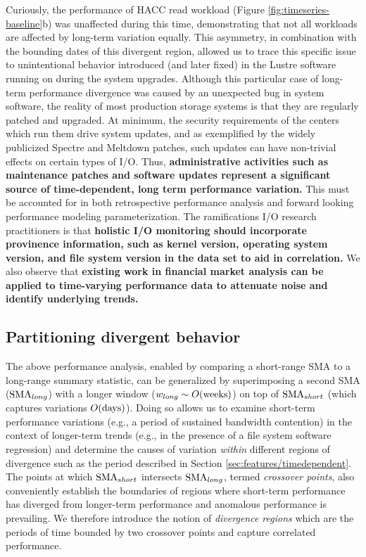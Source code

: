 Curiously, the performance of HACC read workload (Figure \ref{fig:timeseries-baseline}b) was unaffected during this time, demonstrating that not all workloads are affected by long-term variation equally.
This asymmetry, in combination with the bounding dates of this divergent region, allowed us to trace this specific issue to unintentional behavior introduced (and later fixed) in the Lustre software running on \cori during the system upgrades.
Although this particular case of long-term performance divergence was caused by an unexpected bug in system software, the reality of most production storage systems is that they are regularly patched and upgraded.
At minimum, the security requirements of the centers which run them drive system updates, and as exemplified by the widely publicized Spectre and Meltdown patches, such updates can have non-trivial effects on certain types of I/O.
Thus, \textbf{administrative activities such as maintenance patches and
software updates represent a significant source of time-dependent, long term performance
variation.}  This must be accounted for in both retrospective performance
analysis and forward looking performance modeling parameterization.  The
ramifications I/O research practitioners is that \textbf{holistic I/O monitoring
should incorporate provinence
information, such as kernel version, operating system version, and file
system version in the data set to aid in correlation.}  We also observe that
\textbf{existing work in financial market analysis can be applied to
time-varying performance data to attenuate noise and identify underlying
trends.}

\subsection{Partitioning divergent behavior} \label{sec:features/partitioning}

The above performance analysis, enabled by comparing a short-range SMA to a long-range summary statistic, can be generalized by superimposing a second SMA ($\textup{SMA}_{long}$) with a longer window (${w_{long} \sim O(\textup{weeks})}$) on top of $\textup{SMA}_{short}$ (which captures variations ${O(\textup{days})}$).
Doing so allows us to examine short-term performance variations (e.g., a period of sustained bandwidth contention) in the context of longer-term trends (e.g., in the presence of a file system software regression) and determine the causes of variation \emph{within} different regions of divergence such as the period described in Section \ref{sec:features/timedependent}.
The points at which $\textup{SMA}_{short}$ intersects $\textup{SMA}_{long}$, termed \emph{crossover points}, also conveniently establish the boundaries of regions where short-term performance has diverged from longer-term performance and anomalous performance is prevailing.
We therefore introduce the notion of \emph{divergence regions} which are the periods of time bounded by two crossover points and capture correlated performance.

